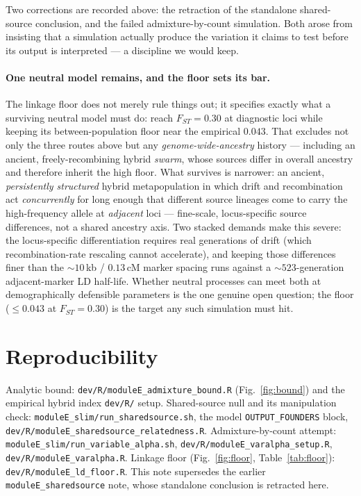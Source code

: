 \documentclass[11pt,a4paper]{article}
\begin{document}
Two corrections are recorded above: the retraction of the standalone shared-source
conclusion, and the failed admixture-by-count simulation. Both arose from insisting that
a simulation actually produce the variation it claims to test before its output is
interpreted --- a discipline we would keep.

\paragraph{One neutral model remains, and the floor sets its bar.} The linkage floor does
not merely rule things out; it specifies exactly what a surviving neutral model must do:
reach $F_{ST}=0.30$ at diagnostic loci while keeping its between-population floor near the
empirical $0.043$. That excludes not only the three routes above but any
\emph{genome-wide-ancestry} history --- including an ancient, freely-recombining hybrid
\emph{swarm}, whose sources differ in overall ancestry and therefore inherit the high
floor. What survives is narrower: an ancient, \emph{persistently structured} hybrid
metapopulation in which drift and recombination act \emph{concurrently} for long enough
that different source lineages come to carry the high-frequency allele at
\emph{adjacent} loci --- fine-scale, locus-specific source differences, not a shared
ancestry axis. Two stacked demands make this severe: the locus-specific differentiation
requires real generations of drift (which recombination-rate rescaling cannot
accelerate), and keeping those differences finer than the $\sim\!10$\,kb / $0.13$\,cM
marker spacing runs against a $\sim\!523$-generation adjacent-marker LD half-life.
Whether neutral processes can meet both at demographically defensible parameters is the
one genuine open question; the floor ($\le 0.043$ at $F_{ST}=0.30$) is the target any
such simulation must hit.

\section*{Reproducibility}
Analytic bound: \texttt{dev/R/moduleE\_admixture\_bound.R} (Fig.~\ref{fig:bound}) and the
empirical hybrid index \texttt{dev/R/} setup. Shared-source null and its manipulation
check: \texttt{moduleE\_slim/run\_sharedsource.sh}, the model \texttt{OUTPUT\_FOUNDERS}
block, \texttt{dev/R/moduleE\_sharedsource\_relatedness.R}. Admixture-by-count attempt:
\texttt{moduleE\_slim/run\_variable\_alpha.sh}, \texttt{dev/R/moduleE\_varalpha\_setup.R},
\texttt{dev/R/moduleE\_varalpha.R}. Linkage floor (Fig.~\ref{fig:floor}, Table~\ref{tab:floor}):
\texttt{dev/R/moduleE\_ld\_floor.R}. This note supersedes the earlier
\texttt{moduleE\_sharedsource} note, whose standalone conclusion is retracted here.
\end{document}
